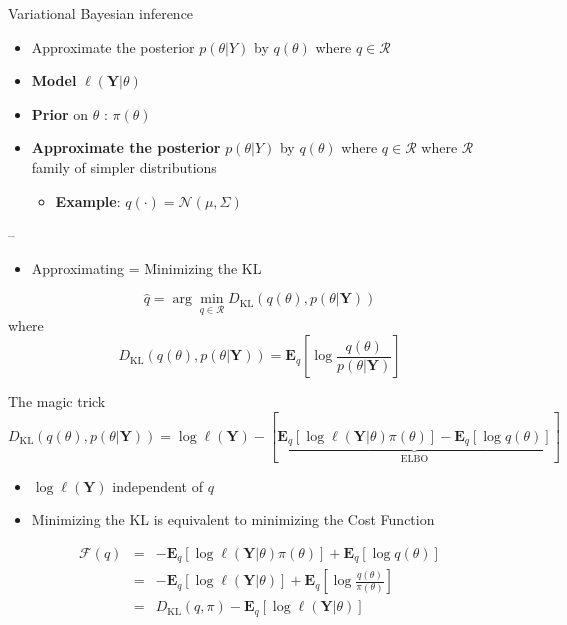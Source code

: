 \documentclass[
  ignorenonframetext,
]{beamer}
\providecommand{\tightlist}{%
  \setlength{\itemsep}{0pt}\setlength{\parskip}{0pt}}
\begin{document}
\begin{frame}{Variational Bayesian inference}
\protect\hypertarget{variational-bayesian-inference}{}
\begin{itemize}
\tightlist
\item
  Approximate the posterior \(p(\theta | Y)\) by \(q(\theta)\) where
  \(q\in \mathcal{R}\)
\end{itemize}

\begin{itemize}
\item
  \textbf{Model} \(\ell(\mathbf{Y} | \theta)\)
\item
  \textbf{Prior} on \(\theta\) : \(\pi(\theta)\)
\item
  \textbf{Approximate the posterior} \(p(\theta | Y)\) by \(q(\theta)\)
  where \(q\in \mathcal{R}\) where \(\mathcal{R}\) family of simpler
  distributions

  \begin{itemize}
  \tightlist
  \item
    \textbf{Example}: \(q(\cdot) = \mathcal{N}(\mu,\Sigma)\)
  \end{itemize}
\end{itemize}

--

\begin{itemize}
\tightlist
\item
  Approximating = Minimizing the KL
\end{itemize}

\[\hat{q} = \arg\min_{q \in\mathcal{R}} D_\text{KL}(q(\theta),p(\theta | \mathbf{Y}))\]
where
\[ D_\text{KL}(q(\theta),p(\theta | \mathbf{Y})) = \mathbf{E}_q\left[\log \frac{q(\theta)}{p(\theta | \mathbf{Y})}\right]\]
\end{frame}

\begin{frame}{The magic trick}
\protect\hypertarget{the-magic-trick}{}
\[D_\text{KL}(q(\theta),p(\theta | \mathbf{Y}))  = \log \ell(\mathbf{Y}) - \left[\underbrace{\mathbf{E}_q[\log \ell(\mathbf{Y}|\theta)\pi(\theta)] -\mathbf{E}_q[\log q(\theta)]}_{\text{ELBO}}\right]\]

\begin{itemize}
\tightlist
\item
  \(\log \ell(\mathbf{Y})\) independent of \(q\)
\end{itemize}

\begin{itemize}
\tightlist
\item
  Minimizing the KL is equivalent to minimizing the Cost Function
\end{itemize}

\begin{eqnarray}
\mathcal{F}(q) &=& -  \mathbf{E}_q[\log \ell(\mathbf{Y}|\theta)\pi(\theta)] + \mathbf{E}_q[\log q(\theta)] \\
&=&  -  \mathbf{E}_q[\log \ell(\mathbf{Y}|\theta)] + \mathbf{E}_q\left[\log \frac{q(\theta)}{\pi(\theta)}\right] \\
&=&D_{\text{KL}}(q,\pi) -  \mathbf{E}_q[\log \ell(\mathbf{Y}|\theta)]   
\end{eqnarray}
\end{frame}
\end{document}
